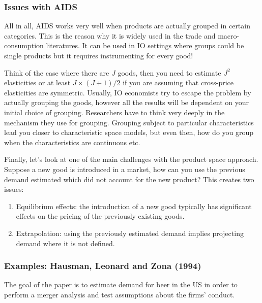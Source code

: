 \subsubsection{Issues with AIDS}

All in all, AIDS works very well when products are actually grouped in certain categories. This is the reason why it is widely used in the trade and macro-consumption literatures. It can be used in IO settings where groups could be single products but it requires instrumenting for every good!

Think of the case where there are $J$ goods, then you need to estimate $J^2$ elasticities or at least $J\times (J+1)/2$ if you are assuming that cross-price elasticities are symmetric. Usually, IO economists try to escape the problem by actually grouping the goods, however all the results will be dependent on your initial choice of grouping. Researchers have to think very deeply in the mechanism they use for grouping. Grouping subject to particular characteristics lead you closer to characteristic space models, but even then, how do you group when the characteristics are continuous etc.

Finally, let's look at one of the main challenges with the product space approach. Suppose a new good is introduced in a market, how can you use the previous demand estimated which did not account for the new product? This creates two issues:\begin{enumerate}
\item Equilibrium effects: the introduction of a new good typically has significant effects on the pricing of the previously existing goods.
\item Extrapolation: using the previously estimated demand implies projecting demand where it is not defined.
\end{enumerate}

\subsubsection{Examples: Hausman, Leonard and Zona (1994)}

The goal of the paper is to estimate demand for beer in the US in order to perform a merger analysis and test assumptions about the firms' conduct.

